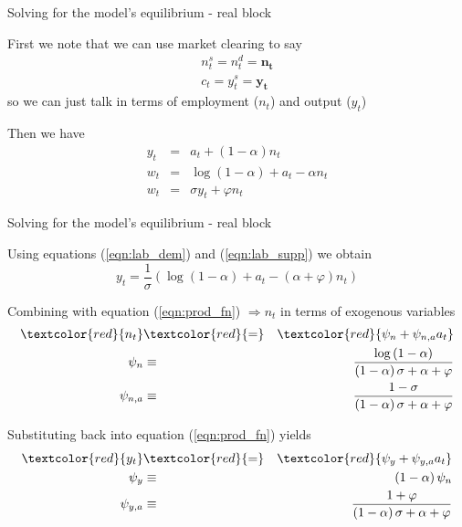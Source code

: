 \begin{frame}{Solving for the model's equilibrium - real block}

First we note that we can use market clearing to say
\begin{eqnarray*}
n^{s}_{t} 	= n^{d}_{t} \mathbf{= n_{t}} \\
c_{t}		= y^{s}_{t} \mathbf{= y_{t}}
\end{eqnarray*}
so we can just talk in terms of employment ($n_{t}$) and output ($y_{t}$)

\vspace{3mm}
Then we have
\begin{eqnarray}
y_{t} &=& a_{t} + \left( 1-\alpha \right) n_{t} \label{eqn:prod_fn} \\
w_{t} &=& \log{\left( 1-\alpha \right)} + a_{t} - \alpha n_{t} \label{eqn:lab_dem} \\
w_{t} &=& \sigma y_{t} + \varphi n_{t} \label{eqn:lab_supp}
\end{eqnarray}

\end{frame}



\begin{frame}{Solving for the model's equilibrium - real block}

Using equations (\ref{eqn:lab_dem}) and (\ref{eqn:lab_supp}) we obtain
\[
y_{t} = \frac{1}{\sigma} \left( \log{\left(1-\alpha \right)} + a_{t} -\left( \alpha + \varphi \right) n_{t} \right)
\]

Combining with equation (\ref{eqn:prod_fn}) $\Rightarrow n_{t}$ in terms of exogenous variables
\begin{eqnarray}
\textcolor{red}{n_{t}}	&\textcolor{red}{=}& \textcolor{red}{\psi_{n} + \psi_{n,a} a_{t}} \label{eqn:n_classical}\\
\psi_{n} &\equiv& \frac{\log{\left( 1 - \alpha \right)}}{\left( 1 - \alpha \right) \sigma + \alpha + \varphi} \nonumber \\
\psi_{n,a} &\equiv& \frac{1-\sigma}{\left( 1 - \alpha \right) \sigma + \alpha + \varphi} \nonumber 
\end{eqnarray}

Substituting back into equation (\ref{eqn:prod_fn}) yields
\begin{eqnarray}
\textcolor{red}{y_{t}}	&\textcolor{red}{=}& \textcolor{red}{\psi_{y} + \psi_{y,a} a_{t}} \label{eqn:y_classical} \\
\psi_{y} &\equiv& \left( 1-\alpha \right) \psi_{n}  \nonumber \\
\psi_{y,a} &\equiv& \frac{1+\varphi}{\left( 1 - \alpha \right) \sigma + \alpha + \varphi}  \nonumber 
\end{eqnarray}

\end{frame}

